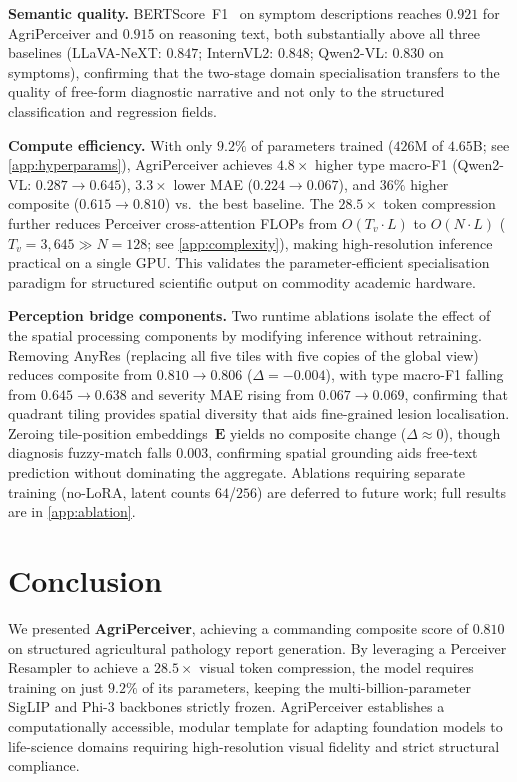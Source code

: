 \documentclass{article}
\newcommand{\ours}{AgriPerceiver}
\begin{document}
\smallskip\noindent\textbf{Semantic quality.}
BERTScore~F1~\citep{zhang2020bertscore} on symptom descriptions reaches
$0.921$ for \ours{} and $0.915$ on reasoning text, both substantially above
all three baselines (LLaVA-NeXT: $0.847$; InternVL2: $0.848$; Qwen2-VL:
$0.830$ on symptoms), confirming that the two-stage domain specialisation
transfers to the quality of free-form diagnostic narrative and not only to
the structured classification and regression fields.

\smallskip\noindent\textbf{Compute efficiency.}
With only $9.2\%$ of parameters trained ($426$M of $4.65$B; see \cref{app:hyperparams}), \ours{} achieves
$4.8{\times}$ higher type macro-F1 (Qwen2-VL: $0.287{\to}0.645$),
$3.3{\times}$ lower MAE ($0.224{\to}0.067$), and $36\%$ higher composite
($0.615{\to}0.810$) vs.~the best baseline.
The $28.5{\times}$ token compression further reduces Perceiver
cross-attention FLOPs from $O(T_v \cdot L)$ to $O(N \cdot L)$
($T_v{=}3{,}645 \gg N{=}128$; see \cref{app:complexity}),
making high-resolution inference practical on a single GPU.
This validates the parameter-efficient specialisation paradigm for
structured scientific output on commodity academic hardware.


\smallskip\noindent\textbf{Perception bridge components.}
Two runtime ablations isolate the effect of the spatial processing components
by modifying inference without retraining.
Removing AnyRes (replacing all five tiles with five copies of the global
view) reduces composite from $0.810 \to 0.806$ ($\Delta{=}{-}0.004$), 
with type macro-F1 falling from $0.645 \to 0.638$ and severity MAE rising
from $0.067 \to 0.069$, confirming that quadrant tiling provides spatial
diversity that aids fine-grained lesion localisation.
Zeroing tile-position embeddings~$\mathbf{E}$ yields no composite change
($\Delta{\approx}0$), though diagnosis fuzzy-match falls $0.003$,
confirming spatial grounding aids free-text prediction without dominating
the aggregate.
Ablations requiring separate training (no-LoRA, latent counts $64$/$256$)
are deferred to future work; full results are in \cref{app:ablation}.

\section{Conclusion}
\label{sec:conclusion}

We presented \textbf{\ours{}}, achieving a commanding composite score of $\mathbf{0.810}$ on structured agricultural pathology report generation. By leveraging a Perceiver Resampler to achieve a $28.5{\times}$ visual token compression, the model requires training on just $9.2\%$ of its parameters, keeping the multi-billion-parameter SigLIP and Phi-3 backbones strictly frozen. \ours{} establishes a computationally accessible, modular template for adapting foundation models to life-science domains requiring high-resolution visual fidelity and strict structural compliance.
\end{document}
